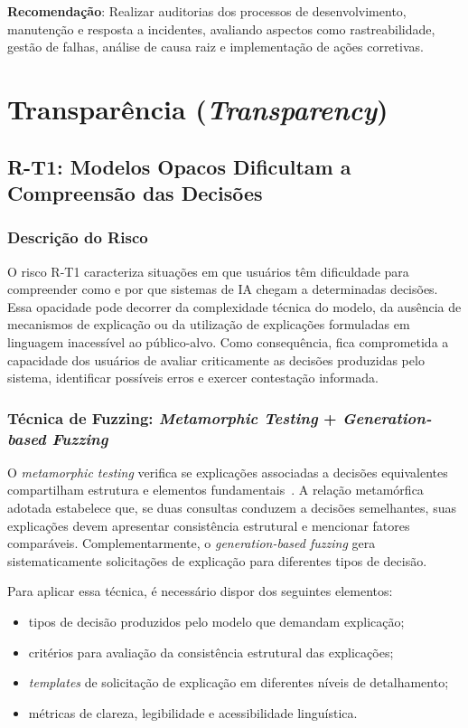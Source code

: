 \textbf{Recomendação}: Realizar auditorias dos processos de desenvolvimento, manutenção e resposta a incidentes, avaliando aspectos como rastreabilidade, gestão de falhas, análise de causa raiz e implementação de ações corretivas.

\section{Transparência (\textit{Transparency})}

\subsection{R-T1: Modelos Opacos Dificultam a Compreensão das Decisões}

\subsubsection{Descrição do Risco}

O risco R-T1 caracteriza situações em que usuários têm dificuldade para compreender como e por que sistemas de IA chegam a determinadas decisões. Essa opacidade pode decorrer da complexidade técnica do modelo, da ausência de mecanismos de explicação ou da utilização de explicações formuladas em linguagem inacessível ao público-alvo. Como consequência, fica comprometida a capacidade dos usuários de avaliar criticamente as decisões produzidas pelo sistema, identificar possíveis erros e exercer contestação informada.

\subsubsection{Técnica de Fuzzing: \textit{Metamorphic Testing} + \textit{Generation-based Fuzzing}}

O \textit{metamorphic testing} verifica se explicações associadas a decisões equivalentes compartilham estrutura e elementos fundamentais~\cite{Chen2018, Xie2011}. A relação metamórfica adotada estabelece que, se duas consultas conduzem a decisões semelhantes, suas explicações devem apresentar consistência estrutural e mencionar fatores comparáveis. Complementarmente, o \textit{generation-based fuzzing} gera sistematicamente solicitações de explicação para diferentes tipos de decisão.

Para aplicar essa técnica, é necessário dispor dos seguintes elementos:

\begin{itemize}
    \item tipos de decisão produzidos pelo modelo que demandam explicação;
    \item critérios para avaliação da consistência estrutural das explicações;
    \item \textit{templates} de solicitação de explicação em diferentes níveis de detalhamento;
    \item métricas de clareza, legibilidade e acessibilidade linguística.
\end{itemize}

